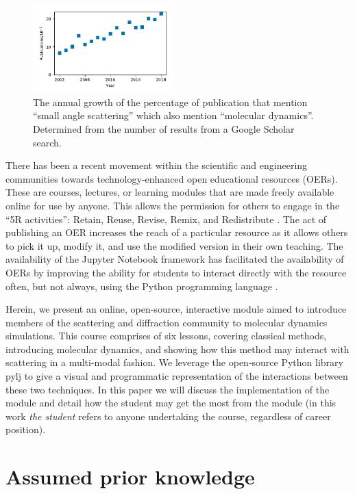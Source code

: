 \documentclass[amsmath,amssymb,twocolumn,superscriptaddress]{revtex4-1}
\begin{document}
%
\begin{figure}
\label{fig:growth}
\includegraphics[width=0.48\textwidth]{figures/chem_data_py.pdf}
\caption{The annual growth of the percentage of publication that mention ``small angle scattering'' which also mention ``molecular dynamics''. Determined from the number of results from a Google Scholar search.}
\end{figure}
%

There has been a recent movement within the scientific and engineering communities towards technology-enhanced open educational resources (OERs).
These are courses, lectures, or learning modules that are made freely available online for use by anyone.
This allows the permission for others to engage in the ``5R activities'': Retain, Reuse, Revise, Remix, and Redistribute \cite{wiley_open_2018}.
The act of publishing an OER increases the reach of a particular resource as it allows others to pick it up, modify it, and use the modified version in their own teaching.
The availability of the Jupyter Notebook framework \cite{kluyver_jupyter_2016} has facilitated the availability of OERs by improving the ability for students to interact directly with the resource often, but not always, using the Python programming language \cite{barba_cybertraining_2017}.

Herein, we present an online, open-source, interactive module aimed to introduce members of the scattering and diffraction community to molecular dynamics simulations.
This course comprises of six lessons, covering classical methods, introducing molecular dynamics, and showing how this method may interact with scattering in a multi-modal fashion.
We leverage the open-source Python library pylj \cite{mccluskey_pylj_2018} to give a visual and programmatic representation of the interactions between these two techniques.
In this paper we will discuss the implementation of the module and detail how the student may get the most from the module (in this work \emph{the student} refers to anyone undertaking the course, regardless of career position).

\section{Assumed prior knowledge}
\end{document}
